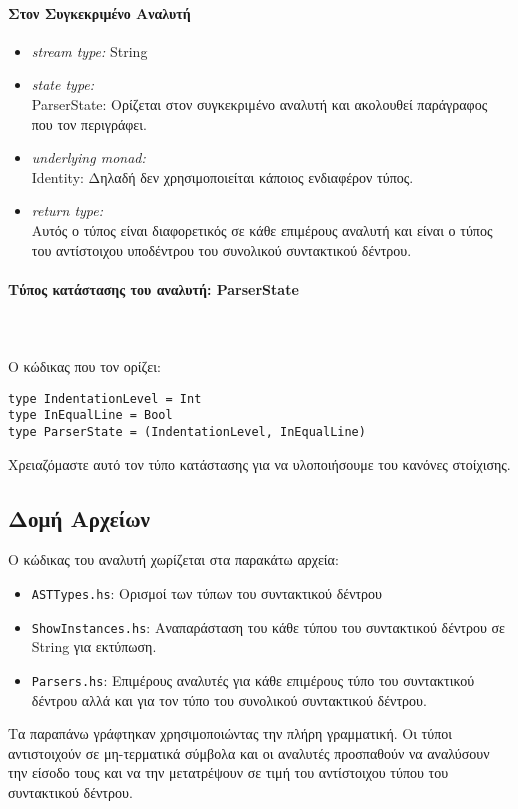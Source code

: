 \documentclass[diploma]{softlab-thesis}
\def\pend{\mbox{}\\\\}
\begin{document}
\paragraph{Στον Συγκεκριμένο Αναλυτή}
\begin{itemize}
\item
  \textit{stream type:} String
\item
  \textit{state type:}
  \\ParserState: Ορίζεται στον συγκεκριμένο αναλυτή και ακολουθεί παράγραφος
  που τον περιγράφει.
\item
  \textit{underlying monad:}
  \\
  Identity: Δηλαδή δεν χρησιμοποιείται κάποιος ενδιαφέρον τύπος.
\item
  \textit{return type:}
  \\
  Αυτός ο τύπος είναι διαφορετικός σε κάθε επιμέρους αναλυτή και είναι ο τύπος
  του αντίστοιχου υποδέντρου του συνολικού συντακτικού δέντρου.
\end{itemize}

\paragraph{Τύπος κατάστασης του αναλυτή: ParserState}\pend
Ο κώδικας που τον ορίζει:
\begin{verbatim}
type IndentationLevel = Int
type InEqualLine = Bool
type ParserState = (IndentationLevel, InEqualLine)
\end{verbatim}
Χρειαζόμαστε αυτό τον τύπο κατάστασης για να υλοποιήσουμε του κανόνες
στοίχισης.

\newpage

\subsection{Δομή Αρχείων}

Ο κώδικας του αναλυτή χωρίζεται στα παρακάτω αρχεία:
\begin{itemize}
\item
\verb|ASTTypes.hs|: Ορισμοί των τύπων του συντακτικού δέντρου
\item
\verb|ShowInstances.hs|:
Αναπαράσταση του κάθε τύπου του συντακτικού δέντρου σε String για εκτύπωση.
\item
\verb|Parsers.hs|:
Επιμέρους αναλυτές για κάθε επιμέρους τύπο του συντακτικού δέντρου αλλά και για
τον τύπο του συνολικού συντακτικού δέντρου.
\end{itemize}
Τα παραπάνω γράφτηκαν χρησιμοποιώντας την πλήρη γραμματική. Οι τύποι
αντιστοιχούν σε μη-τερματικά σύμβολα και οι αναλυτές προσπαθούν να αναλύσουν την
είσοδο τους και να την μετατρέψουν σε τιμή του αντίστοιχου τύπου του
συντακτικού δέντρου.
\end{document}
